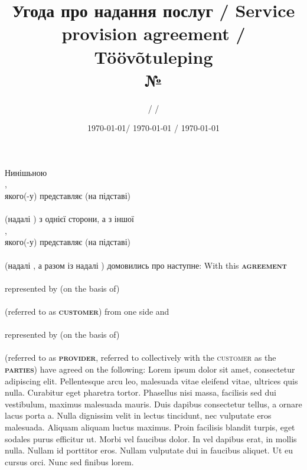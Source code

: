   \begin{Form}
    \title{Угода про надання послуг / Service provision agreement / Töövõtuleping\\№ }
    \author{ /  / }
    \date{\today / \textenglish{\today} / \textestonian{\today}}
    \maketitle
    \thispagestyle{fancy}

    \begin{paracol}{3}
      \freetext %
        {Нинішьною \textbf{}\\
          ,\\
          якого(-у) представляє (на підставі)\\
          \\
          (надалі \textbf{}) з однієї сторони, а з іншої\\
          ,\\
          якого(-у) представляє (на підставі)\\
          \\
          (надалі \textbf{}, а разом із  надалі \textbf{}) домовились про наступне:
        }
        { With this \textbf{\textsc{agreement}}\\
          \\
          represented by (on the basis of)\\
          \\
          (referred to as \textbf{\textsc{customer}}) from one side and\\
          \\
          represented by (on the basis of)\\
          \\
          (referred to as \textbf{\textsc{provider}}, referred to collectively with the \textsc{customer} as the \textbf{\textsc{parties}}) have agreed on the following:
          }
        {Lorem ipsum dolor sit amet, consectetur adipiscing elit. Pellentesque arcu leo, malesuada vitae eleifend vitae, ultrices quis nulla. Curabitur eget pharetra tortor. Phasellus nisi massa, facilisis sed dui vestibulum, maximus malesuada mauris. Duis dapibus consectetur tellus, a ornare lacus porta a. Nulla dignissim velit in lectus tincidunt, nec vulputate eros malesuada. Aliquam aliquam luctus maximus. Proin facilisis blandit turpis, eget sodales purus efficitur ut. Morbi vel faucibus dolor. In vel dapibus erat, in mollis nulla. Nullam id porttitor eros. Nullam vulputate dui in faucibus aliquet. Ut eu cursus orci. Nunc sed finibus lorem.}

\end{paracol}
\end{Form}
